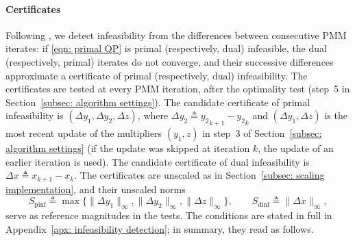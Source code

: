 \paragraph{Certificates} Following \cite{DeMarchi2022_PDnproxQP,Hermans_2022}, we detect infeasibility from the differences between consecutive PMM iterates: if \eqref{eqn: primal QP} is primal (respectively, dual) infeasible, the dual (respectively, primal) iterates do not converge, and their successive differences approximate a certificate of primal (respectively, dual) infeasibility. The certificates are tested at every PMM iteration, after the optimality test (step~5 in Section~\ref{subsec: algorithm settings}). The candidate certificate of primal infeasibility is $(\Delta y_1, \Delta y_2, \Delta z)$, where $\Delta y_2 \triangleq {y_2}_{k+1} - {y_2}_k$ and $(\Delta y_1,\Delta z)$ is the most recent update of the multipliers $(y_1,z)$ in step~3 of Section~\ref{subsec: algorithm settings} (if the update was skipped at iteration $k$, the update of an earlier iteration is used). The candidate certificate of dual infeasibility is $\Delta x \triangleq x_{k+1} - x_k$. The certificates are unscaled as in Section~\ref{subsec: scaling implementation}, and their unscaled norms
\[
    S_{\mathrm{pinf}} \triangleq \max\{\|\Delta y_1\|_\infty, \|\Delta y_2\|_\infty, \|\Delta z\|_\infty\}, \qquad S_{\mathrm{dinf}} \triangleq \|\Delta x\|_\infty,
\]
serve as reference magnitudes in the tests. The conditions are stated in full in Appendix~\ref{apx: infeasibility detection}; in summary, they read as follows.
